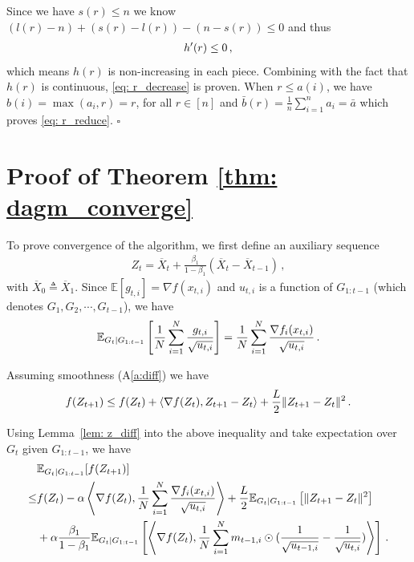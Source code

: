 \documentclass[anon,12pt]{colt2021} %
\begin{document}
Since we have $s(r) \leq n$ we know $(l(r) - n) + (s(r) - l(r)) - (n-s(r)) \leq 0$ and thus
\begin{align}\notag
h'(r) \leq 0 \, ,
\end{align}
which means $h(r)$ is non-increasing in each piece. Combining with the fact that $h(r)$ is continuous, \eqref{eq: r_decrease} is proven.
When $r \leq a(i)$, we have $b(i) = \max(a_i,r) = r$, for all $r \in [n]$ and $\bar b(r) = \frac{1}{n}\sum_{i=1}^n a_i = \bar a$ which proves \eqref{eq: r_reduce}.
\hfill $\square$


\clearpage

\section{Proof of Theorem \ref{thm: dagm_converge}}\label{app: proof_thm_adm}


To prove convergence of the algorithm, we first define an auxiliary sequence 
\begin{align}\label{eq: seq_z}
Z_{t} = \overline X_t + \frac{\beta_1}{1-\beta_1} (\overline X_t - \overline X_{t-1}) \, ,
\end{align}
with $\overline X_{0} \triangleq \overline X_1$.
Since $\mathbb E[g_{t,i}] = \nabla f(x_{t,i})$ and $u_{t,i}$ is a function of $G_{1:t-1}$ (which denotes $G_1,G_2,\cdots,G_{t-1}$), we have 
\begin{align}\notag
\mathbb E_{G_t|G_{1:t-1}} \left[\frac{1}{N} \sum_{i=1}^N \frac{g_{t,i}}{\sqrt{u_{t,i}}}\right] =\frac{1}{N} \sum_{i=1}^N \frac{\nabla f_i(x_{t,i})}{\sqrt{u_{t,i}}} \, .
\end{align}

Assuming smoothness (A\ref{a:diff}) we have 
\begin{align}\notag
f( Z_{t+1}) \leq f( Z_{t}) + \langle \nabla f( Z_{t}),  Z_{t+1}-  Z_{t} \rangle + \frac{L}{2}\| Z_{t+1}-  Z_{t}\|^2 \, .
\end{align}

Using Lemma~\ref{lem: z_diff} into the above inequality and take expectation over $G_{t}$ given $G_{1:t-1}$, we have 
\begin{align}\notag
\begin{split}
&\mathbb E_{G_t|G_{1:t-1}} [f( Z_{t+1})]\\
\leq & f( Z_{t})  - \alpha  \left \langle \nabla f( Z_{t}), \frac{1}{N} \sum_{i=1}^N \frac{\nabla f_i(x_{t,i})}{\sqrt{u_{t,i}}}  \right \rangle + \frac{L}{2} \mathbb E_{G_t|G_{1:t-1}}\left[\| Z_{t+1}-  Z_{t}\|^2 \right]   \\
&+ \alpha \frac{\beta_1}{1-\beta_1}  \mathbb E_{G_t|G_{1:t-1}} \left [\left \langle \nabla f( Z_{t}) , \frac{1}{N} \sum_{i=1}^N m_{t-1	,i} \odot (\frac{1}{\sqrt{u_{t-1,i}}} - \frac{1}{\sqrt{u_{t,i}}}) \right \rangle \right] \, .
\end{split}
\end{align}
\end{document}

